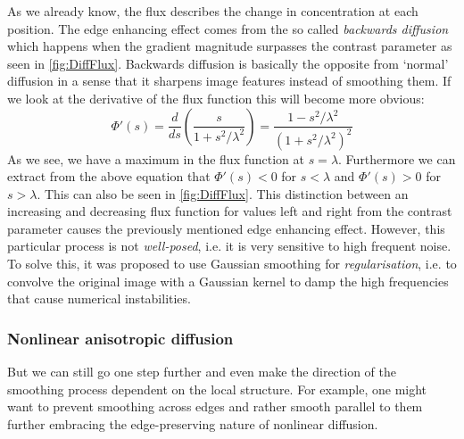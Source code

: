 As we already know, the flux describes the change in concentration at each position. The edge
enhancing effect comes from the so called \textit{backwards diffusion} which happens when the
gradient magnitude surpasses the contrast parameter as seen in \ref{fig:DiffFlux}. Backwards
diffusion is basically the opposite from `normal' diffusion in a sense that it sharpens image
features instead of smoothing them.
If we look at the derivative of the flux function this will become more obvious:
\begin{equation}
    \Phi'(s) = \frac{d}{ds} \left(\frac{s}{1 + s^2/\lambda^2}\right) = 
    \frac{1 - s^2/\lambda^2}{\left(1 + s^2/\lambda^2\right)^2}
\end{equation}
As we see, we have a maximum in the flux function at $s = \lambda$. Furthermore we can extract from
the above equation that $\Phi'(s) < 0$ for $s < \lambda$ and $\Phi'(s) > 0$ for $s > \lambda$. This
can also be seen in \ref{fig:DiffFlux}. This distinction between an increasing and decreasing flux
function for values left and right from the contrast parameter causes the previously mentioned
edge enhancing effect.
However, this particular process is not \textit{well-posed}\cite{weickert96}, i.e. it is very
sensitive to high frequent noise. To solve this, it was proposed to use Gaussian smoothing for
\textit{regularisation}, i.e. to convolve the original image with a Gaussian kernel to damp the high
frequencies that cause numerical instabilities\cite{catte-lions-morel92}.

\subsubsection{Nonlinear anisotropic diffusion}
But we can still go one step further and even make the direction of the smoothing process dependent
on the local structure. For example, one might want to prevent smoothing across edges and rather
smooth parallel to them further embracing the edge-preserving nature of nonlinear diffusion.

